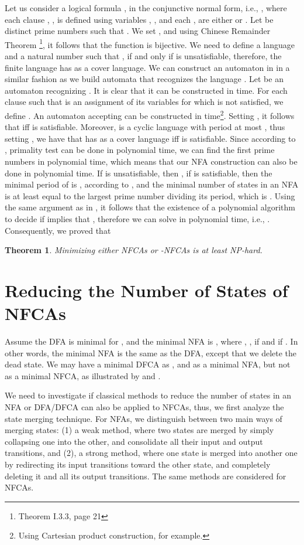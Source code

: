 \documentclass[submission,copyright,creativecommons]{eptcs}
\newtheorem{theorem}{Theorem}
\begin{document}
Let us consider a logical formula , 
 in the conjunctive normal form, i.e., ,
where each clause , ,
is defined using variables , , and each ,  are either  or .
Let  be distinct prime numbers such that
. We set , and 
using Chinese Remainder Theorem \cite{china}\footnote{Theorem I.3.3, page 21},
it follows that the function  is bijective.
We need to define a language  and a natural number  such that
, if and only if   is unsatisfiable, therefore, the finite language 
 has  as a cover language.
We can construct an automaton  in  in a similar fashion as we build automata 
that recognizes the language
.
Let  be an automaton recognizing . 
It is clear that it can be constructed in  time.
For each clause  such that  is an assignment of its 
variables  for which 
 is not satisfied, we define .
An automaton  accepting   can be constructed 
in  time\footnote{Using Cartesian product construction, for example.}. 
Setting , it follows that 
 iff  is satisfiable. Moreover,  is a cyclic language with period at most ,
 thus setting , we have that 
 has 
as a cover language iff
  is satisfiable. 
Since according to \cite{Primtest}, primality test can be done in polynomial time, 
 we can find the first  prime numbers  in polynomial time, 
which means that our NFA construction can also be done in polynomial time.
If  is unsatisfiable, then , if  is satisfiable,
then the  minimal period of  is , according to \cite{Chrobak,gramlich}, 
 and the minimal number of states 
in an NFA is at least equal to the largest prime number dividing its period, which is . 
Using  the same argument as in \cite{gruberholzerunary}, it 
follows that the existence of a polynomial algorithm to decide if   implies that 
, therefore we can solve  in polynomial time, i.e., .
Consequently, we proved that
\begin{theorem}
 Minimizing either NFCAs or -NFCAs is at least NP-hard. 
\end{theorem}


\section{Reducing the Number of States of NFCAs}
\label{sheuristic}

Assume the DFA  is minimal for , and the minimal NFA is
, 
where , , if  and  if .
In other words, the minimal NFA is the same as the DFA, except that we delete the dead state.
We may have a minimal DFCA as , and  as a minimal NFA, but not as a minimal NFCA,  as illustrated by
 and .

We need to investigate if classical methods to reduce the number of states in an NFA or DFA/DFCA
can also be applied to NFCAs, thus, we first analyze the state  merging technique.
For NFAs,  we distinguish between  two main ways of merging states: (1) a weak method,
where two states are merged by simply collapsing one into the other, and consolidate
all their input and output transitions, and (2), a strong method, where one state is
merged into another one by redirecting its input transitions toward the other state,
and completely deleting it and all its output transitions. 
The same methods are considered for NFCAs.
\end{document}
